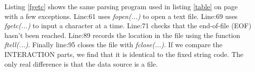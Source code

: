 Listing \ref{fgetc} shows the same parsing program used in listing \ref{table} on page \pageref{tablee} with a few exceptions. Line:61 uses \textit{fopen(...)} to open a text file. Line:69 uses \textit{fgetc(...)} to input a character at a time. Line:71 checks that the end-of-file (EOF) hasn't been reached. Line:89 records the location in the file using the function \textit{ftell(...)}. Finally line:95 closes the file with \textit{fclose(...)}. If we compare the INTERACTION parts, we find that it is identical to the fixed string code. The only real difference is that the data source is a file. 

 
 